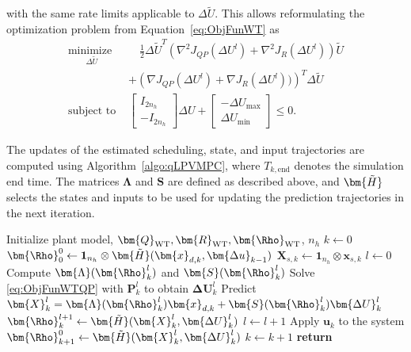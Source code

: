 with the same rate limits applicable to $\Delta \tilde{U}$. This allows reformulating the optimization problem from Equation~\eqref{eq:ObjFunWT} as %
\begin{equation} \label{eq:ObjFunWTQP}
   \begin{aligned} 
       \underset{\Delta \tilde{U}}{\text{minimize }} & \quad 
       \frac{1}{2} \Delta \tilde{U}^T 
       \left(\nabla^2 J_{QP} (\Delta U^l) + \nabla^2 J_R(\Delta U^l) \right) \tilde{U} \\
       & + \left(\nabla J_{QP} (\Delta U^l) + \nabla J_R(\Delta U^l))\right)^T \Delta \tilde{U} \\
       \text{subject to }   &  \begin{bmatrix} I_{2 n_h} \\ -I_{2 n_h} \end{bmatrix} \Delta U +
       \begin{bmatrix} - \Delta U_{\text{max}} \\ \Delta U_{\text{min}} \end{bmatrix} \leq 0. 
   \end{aligned}
\end{equation}

The updates of the estimated scheduling, state, and input trajectories are computed using Algorithm~\ref{algo:qLPVMPC}, where \(T_{k,\text{end}}\) denotes the simulation end time. The matrices \(\bm{\Lambda}\) and \(\bm{S}\) are defined as described above, and \(\bm{\Tilde{H}}\) selects the states and inputs to be used for updating the prediction trajectories in the next iteration.
\begin{algorithm}
    \caption{qLMPC}\label{algo:qLPVMPC}
    \begin{algorithmic}[1]
        \State Initialize plant model, \(\bm{Q}_{\text{WT}}, \bm{R}_{\text{WT}}, \bm{\Rho}_{\text{WT}}\), \(n_h\)
        \State \(k \gets 0\)
        \State \(\bm{\Rho}^0_{0} \gets \mathbf{1}_{n_h} \otimes \bm{\tilde{H}}(\bm{x}_{d,k}, \bm{\Delta u}_{k-1})\)
        \State \(\bm{X}_{s,k} \gets \mathbf{1}_{n_h} \otimes \bm{x}_{s,k}\)
        \State \(l \gets 0\)
        \State Compute \(\bm{\Lambda}(\bm{\Rho}_k^l)\) and \(\bm{S}(\bm{\Rho}_k^l)\)
        \State Solve \eqref{eq:ObjFunWTQP} with \(\bm{P}_k^l\) to obtain \(\bm{\Delta U}_k^l\)
        \State Predict \(\bm{X}_k^l = \bm{\Lambda}(\bm{\Rho}_k^l)\bm{x}_{d,k} + \bm{S}(\bm{\Rho}_k^l) \bm{\Delta U}_k^l\)
        \State \(\bm{\Rho}^{l+1}_{k} \gets \bm{\tilde{H}}(\bm{X}_k^l, \bm{\Delta U}_k^l)\)
        \State \(l \gets l + 1\)
        \EndWhile
        \State Apply \(\bm{u}_k\) to the system
        \State \(\bm{\Rho}^0_{k+1} \gets \bm{\tilde{H}}(\bm{X}_k^l, \bm{\Delta U}_k^l)\)
        \State \(k \gets k + 1\)
        \EndWhile
        \State \textbf{return}
        \EndProcedure
    \end{algorithmic}
\end{algorithm}

